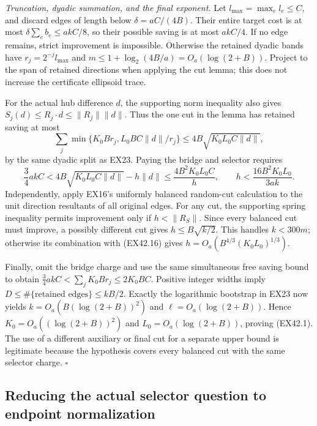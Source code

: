 \emph{Truncation, dyadic summation, and the final exponent.}
Let $l_{\max}=\max_e l_e\le C$, and discard edges of length below
$\delta=aC/(4B)$. Their entire target cost is at most
$\delta\sum_e b_e\le akC/8$, so their possible saving is at most
$akC/4$. If no edge remains, strict improvement is impossible.
Otherwise the retained dyadic bands have
$r_j=2^{-j}l_{\max}$ and
$m\le1+\log_2(4B/a)=O_a(\log(2+B))$.
Project to the span of retained directions when applying the cut
lemma; this does not increase the certificate ellipsoid trace.

For the actual hub difference $d$, the supporting norm inequality
also gives $S_j(d)\le R_j\cdot d\le\|R_j\|\|d\|$.
Thus the one cut in the lemma has retained saving at most
\[
 \sum_j\min\{K_0Br_j,L_0BC\|d\|/r_j\}
 \le4B\sqrt{K_0L_0C\|d\|},
\]
by the same dyadic split as EX23. Paying the bridge and selector
requires
\[
 \frac34akC
 <4B\sqrt{K_0L_0C\|d\|}-h\|d\|
 \le\frac{4B^2K_0L_0C}{h},
 \qquad
 h<\frac{16B^2K_0L_0}{3ak}.
 \tag{EX42.16}
\]
Independently, apply EX16's uniformly balanced random-cut calculation
to the unit direction resultants of all original edges. For any cut,
the supporting spring inequality permits improvement only if
$h<\|R_S\|$. Since every balanced cut must improve, a possibly
different cut gives $h\le B\sqrt{k/2}$. This handles $k<300m$;
otherwise its combination with (EX42.16) gives
$h=O_a(B^{4/3}(K_0L_0)^{1/3})$.

Finally, omit the bridge charge and use the same simultaneous free
saving bound to obtain
$\tfrac34akC<\sum_jK_0Br_j\le2K_0BC$.
Positive integer widths imply
$D\le\#\{\text{retained edges}\}\le kB/2$. Exactly the logarithmic
bootstrap in EX23 now yields
$k=O_a(B(\log(2+B))^2)$ and $\ell=O_a(\log(2+B))$.
Hence $K_0=O_a((\log(2+B))^2)$ and
$L_0=O_a(\log(2+B))$, proving (EX42.1).
The use of a different auxiliary or final cut for a separate upper
bound is legitimate because the hypothesis covers every balanced
cut with the same selector charge. \hfill$\square$



\subsection{Reducing the actual selector question to endpoint normalization}
\label{sec:ex-endpoint-normalization}

